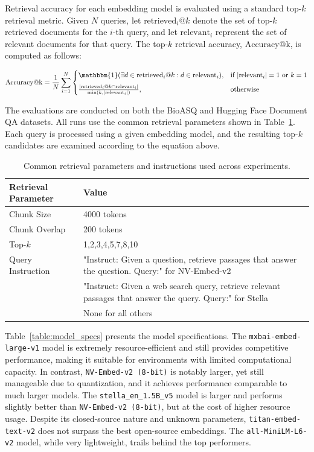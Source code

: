 \documentclass{scrartcl}
\begin{document}
Retrieval accuracy for each embedding model is evaluated using a standard top-$k$ retrieval metric. Given $N$ queries, let $\text{retrieved}_i@k$ denote the set of top-$k$ retrieved documents for the $i$-th query, and let $\text{relevant}_i$ represent the set of relevant documents for that query. The top-$k$ retrieval accuracy, $\text{Accuracy@k}$, is computed as follows:

\begin{equation}
\text{Accuracy@k} = \frac{1}{N} \sum_{i=1}^{N} 
    \begin{cases}
      \mathbbm{1}(\exists d \in \text{retrieved}_i@k : d \in \text{relevant}_i), & \text{if } |\text{relevant}_i| = 1 \text{ or } k = 1 \\[6pt]
      \frac{|\text{retrieved}_i@k \cap \text{relevant}_i|}{\min(k, |\text{relevant}_i|)}, & \text{otherwise}
    \end{cases}
\end{equation}

The evaluations are conducted on both the BioASQ and Hugging Face Document QA datasets. All runs use the common retrieval parameters shown in Table~\ref{table:retrieval_params}. Each query is processed using a given embedding model, and the resulting top-$k$ candidates are examined according to the equation above.

\begin{table}[H]
\centering
\begin{tabular}{|l|l|}
\hline
\textbf{Retrieval Parameter} & \textbf{Value} \\
\hline
Chunk Size & 4000 tokens \\
Chunk Overlap & 200 tokens \\
Top-$k$ & 1,2,3,4,5,7,8,10 \\
Query Instruction & "Instruct: Given a question, retrieve passages that answer the question. Query:" for NV-Embed-v2 \\ 
~ & "Instruct: Given a web search query, retrieve relevant passages that answer the query. Query:" for Stella \\
~ & None for all others \\
\hline
\end{tabular}
\caption{Common retrieval parameters and instructions used across experiments.}
\label{table:retrieval_params}
\end{table}

Table~\ref{table:model_specs} presents the model specifications. The \texttt{mxbai-embed-large-v1} model is extremely resource-efficient and still provides competitive performance, making it suitable for environments with limited computational capacity. In contrast, \texttt{NV-Embed-v2 (8-bit)} is notably larger, yet still manageable due to quantization, and it achieves performance comparable to much larger models. The \texttt{stella\_en\_1.5B\_v5} model is larger and performs slightly better than \texttt{NV-Embed-v2 (8-bit)}, but at the cost of higher resource usage. Despite its closed-source nature and unknown parameters, \texttt{titan-embed-text-v2} does not surpass the best open-source embeddings. The \texttt{all-MiniLM-L6-v2} model, while very lightweight, trails behind the top performers.
\end{document}
